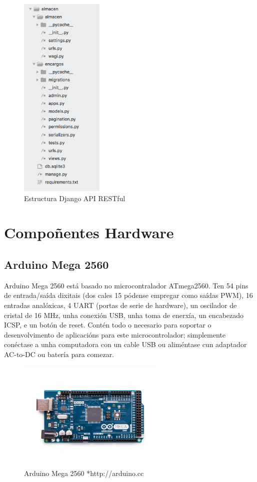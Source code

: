 \documentclass[11pt,twoside]{book}
\begin{document}
\begin{figure}[H]
	\begin{center}
		\includegraphics[width=4cm]{images/estructura_djangoREST.png}
	\end{center}
	\caption{Estructura Django API RESTful}
	\label{fig:EstructuraDjangoAPI}
\end{figure}


\chapter{Compoñentes Hardware}
\section{Arduino Mega 2560}

Arduino Mega 2560 está basado no microcontralador ATmega2560. Ten 54 pins de entrada/saída dixitais (dos cales 15 pódense empregar como saídas PWM), 16 entradas analóxicas, 4 UART (portas de serie de hardware), un oscilador de cristal de 16 MHz, unha conexión USB, unha toma de enerxía, un encabezado ICSP, e un botón de reset. Contén todo o necesario para soportar o desenvolvimento de aplicacións para este microcontrolador; simplemente conéctase a unha computadora con un cable USB ou aliméntase cun adaptador AC-to-DC ou batería para comezar. 

\begin{figure}[H]
	\begin{center}
		\includegraphics[width=7cm]{images/arduino_mega.jpg}
	\end{center}
	\caption{Arduino Mega 2560 *http://arduino.cc}
	\label{fig:ArduinoMega}
\end{figure}
\end{document}
